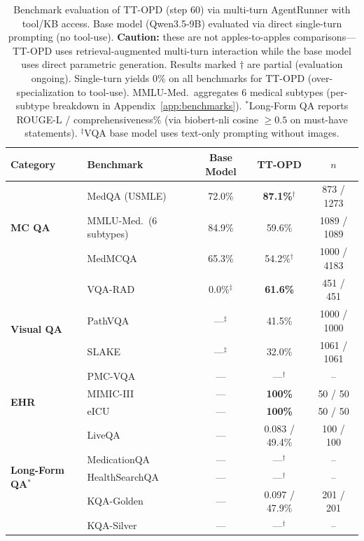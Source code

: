 \documentclass{article}
\begin{document}
\begin{table}[t]
\centering
\caption{Benchmark evaluation of TT-OPD (step 60) via multi-turn AgentRunner with tool/KB access. Base model (Qwen3.5-9B) evaluated via direct single-turn prompting (no tool-use). \textbf{Caution:} these are not apples-to-apples comparisons---TT-OPD uses retrieval-augmented multi-turn interaction while the base model uses direct parametric generation. Results marked $\dagger$ are partial (evaluation ongoing). Single-turn yields 0\% on all benchmarks for TT-OPD (over-specialization to tool-use). MMLU-Med.\ aggregates 6 medical subtypes (per-subtype breakdown in Appendix~\ref{app:benchmarks}). $^*$Long-Form QA reports ROUGE-L / comprehensiveness\% (via biobert-nli cosine $\geq 0.5$ on must-have statements). $^\ddagger$VQA base model uses text-only prompting without images.}
\label{tab:benchmark_multiturn}
\small
\begin{tabular}{llccc}
\toprule
\textbf{Category} & \textbf{Benchmark} & \textbf{Base Model} & \textbf{TT-OPD} & \textbf{$n$} \\
\midrule
\multirow{3}{*}{\textbf{MC QA}}
  & MedQA (USMLE) & 72.0\% & \textbf{87.1\%}$^\dagger$ & 873 / 1273 \\
  & MMLU-Med.\ (6 subtypes) & 84.9\% & 59.6\% & 1089 / 1089 \\
  & MedMCQA & 65.3\% & 54.2\%$^\dagger$ & 1000 / 4183 \\
\midrule
\multirow{4}{*}{\textbf{Visual QA}}
  & VQA-RAD & 0.0\%$^\ddagger$ & \textbf{61.6\%} & 451 / 451 \\
  & PathVQA & ---$^\ddagger$ & 41.5\% & 1000 / 1000 \\
  & SLAKE & ---$^\ddagger$ & 32.0\% & 1061 / 1061 \\
  & PMC-VQA & --- & ---$^\dagger$ & -- \\
\midrule
\multirow{2}{*}{\textbf{EHR}}
  & MIMIC-III & --- & \textbf{100\%} & 50 / 50 \\
  & eICU & --- & \textbf{100\%} & 50 / 50 \\
\midrule
\multirow{5}{*}{\textbf{Long-Form QA$^*$}}
  & LiveQA & --- & 0.083 / 49.4\% & 100 / 100 \\
  & MedicationQA & --- & ---$^\dagger$ & -- \\
  & HealthSearchQA & --- & ---$^\dagger$ & -- \\
  & KQA-Golden & --- & 0.097 / 47.9\% & 201 / 201 \\
  & KQA-Silver & --- & ---$^\dagger$ & -- \\
\bottomrule
\end{tabular}
\end{table}
\end{document}
